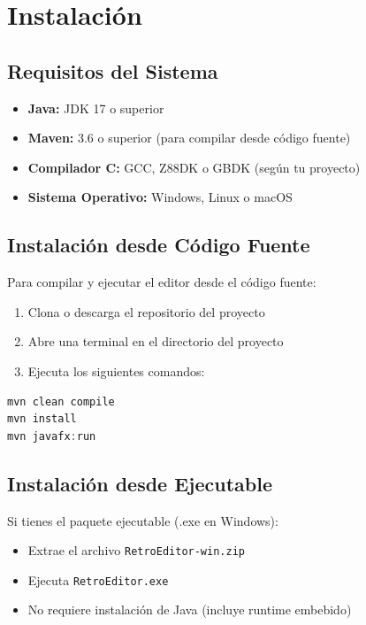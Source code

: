 \documentclass[../../main.tex]{subfiles}
\begin{document}
\clearpage

\section{Instalación}
\subsection{Requisitos del Sistema}
\begin{itemize}
    \item \textbf{Java:} JDK 17 o superior
    \item \textbf{Maven:} 3.6 o superior (para compilar desde código fuente)
    \item \textbf{Compilador C:} GCC, Z88DK o GBDK (según tu proyecto)
    \item \textbf{Sistema Operativo:} Windows, Linux o macOS
\end{itemize}

\subsection{Instalación desde Código Fuente}
Para compilar y ejecutar el editor desde el código fuente:
\begin{enumerate}
    \item Clona o descarga el repositorio del proyecto
    \item Abre una terminal en el directorio del proyecto
    \item Ejecuta los siguientes comandos:
\end{enumerate}

\begin{lstlisting}[language = Java]
mvn clean compile
mvn install
mvn javafx:run
\end{lstlisting}

\subsection{Instalación desde Ejecutable}
Si tienes el paquete ejecutable (.exe en Windows):
\begin{itemize}
    \item Extrae el archivo \texttt{RetroEditor-win.zip}
    \item Ejecuta \texttt{RetroEditor.exe}
    \item No requiere instalación de Java (incluye runtime embebido)
\end{itemize}
\end{document}
